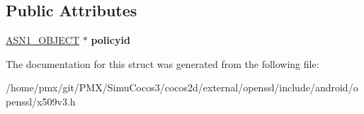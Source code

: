 \subsection*{Public Attributes}
\begin{DoxyCompactItemize}
\item 
\mbox{\label{structPOLICYINFO__st_aa4983dfa21b8be1695a866315d40c349}} 
\hyperlink{structasn1__object__st}{A\+S\+N1\+\_\+\+O\+B\+J\+E\+CT} $\ast$ {\bfseries policyid}
\end{DoxyCompactItemize}


The documentation for this struct was generated from the following file\+:\begin{DoxyCompactItemize}
\item 
/home/pmx/git/\+P\+M\+X/\+Simu\+Cocos3/cocos2d/external/openssl/include/android/openssl/x509v3.\+h\end{DoxyCompactItemize}
